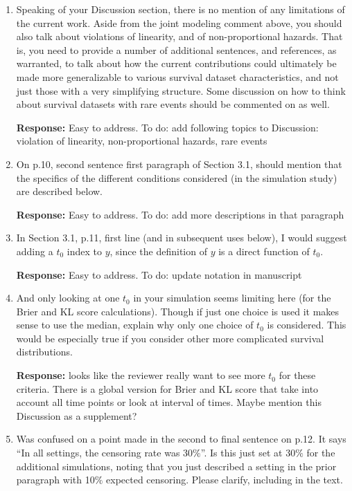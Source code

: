 \documentclass[12]{article}
\newcommand{\re}{\textbf{Response: }}
\newcommand\bd[1]{{\color{blue}#1}}
\begin{document}
\begin{enumerate}[align = left]
\begin{enumerate}
    \end{enumerate}

\item Speaking of your Discussion section, there is no mention of any limitations of the current work. Aside from the joint modeling comment above, you should also talk about violations of linearity, and of non-proportional hazards. That is, you need to provide a number of additional sentences, and references, as warranted, to talk about how the current contributions could ultimately be made more generalizable to various survival dataset characteristics, and not just those with a very simplifying structure. Some discussion on how to think about survival datasets with rare events should be commented on as well.

\re \bd{Easy to address. To do: add following topics to Discussion: violation of linearity, non-proportional hazards, rare events}

\item On p.10, second sentence first paragraph of Section 3.1, should mention that the specifics of the different conditions considered (in the simulation study) are described below.

\re \bd{Easy to address. To do: add more descriptions in that paragraph}

\item In Section 3.1, p.11, first line (and in subsequent uses below), I would suggest adding a $t_0$ index to $y$, since the definition of $y$ is a direct function of $t_0$.

\re \bd{Easy to address. To do: update notation in manuscript}

\item And only looking at one $t_0$ in your simulation seems limiting here (for the Brier and KL score calculations). Though if just one choice is used it makes sense to use the median, explain why only one choice of $t_0$ is considered.  This would be especially true if you consider other more complicated survival distributions.

\re \bd{looks like the reviewer really want to see more $t_0$ for these criteria. There is a global version for Brier and KL score that take into account all time points or look at interval of times. Maybe mention this Discussion as a supplement?}

\item Was confused on a point made in the second to final sentence on p.12. It says “In all settings, the censoring rate was 30$\%$”. Is this just set at 30$\%$ for the additional simulations, noting that you just described a setting in the prior paragraph with 10$\%$ expected censoring. Please clarify, including in the text. 


\end{enumerate}
\end{document}
